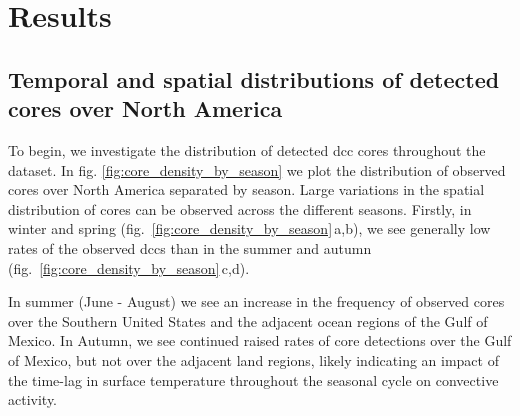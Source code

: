 

\section{Results}


\subsection{Temporal and spatial distributions of detected cores over North America}


To begin, we investigate the distribution of detected \acrshort{dcc} cores throughout the dataset.
In fig. \ref{fig:core_density_by_season} we plot the distribution of observed cores over North America separated by season.
Large variations in the spatial distribution of cores can be observed across the different seasons.
Firstly, in winter and spring (fig.~\ref{fig:core_density_by_season}\,a,b), we see generally low rates of the observed \acrshort{dcc}s than in the summer and autumn (fig.~\ref{fig:core_density_by_season}\,c,d).

In summer (June - August) we see an increase in the frequency of observed cores over the Southern United States and the adjacent ocean regions of the Gulf of Mexico.
In Autumn, we see continued raised rates of core detections over the Gulf of Mexico, but not over the adjacent land regions, likely indicating an impact of the time-lag in surface temperature throughout the seasonal cycle on convective activity.

